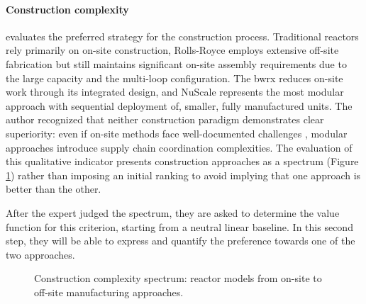 \paragraph{Construction complexity} evaluates the preferred strategy for the construction process. Traditional reactors rely primarily on on-site construction, Rolls-Royce employs extensive off-site fabrication but still maintains significant on-site assembly requirements due to the large capacity and the multi-loop configuration. The \gls{bwrx} reduces on-site work through its integrated design, and NuScale represents the most modular approach with sequential deployment of, smaller, fully manufactured units. The author recognized that neither construction paradigm demonstrates clear superiority: even if on-site methods face well-documented challenges \cite{nea2020unlocking}, modular approaches introduce supply chain coordination complexities. The evaluation of this qualitative indicator presents construction approaches as a spectrum (Figure \ref{fig:construction-spectrum}) rather than imposing an initial ranking to avoid implying that one approach is better than the other. 

After the expert judged the spectrum, they are asked to determine the value function for this criterion, starting from a neutral linear baseline. In this second step, they will be able to express and quantify the preference towards one of the two approaches.
\begin{figure}[h]
    \centering
    \caption{Construction complexity spectrum: reactor models from on-site to off-site manufacturing approaches.}
    \label{fig:construction-spectrum}
\end{figure}

